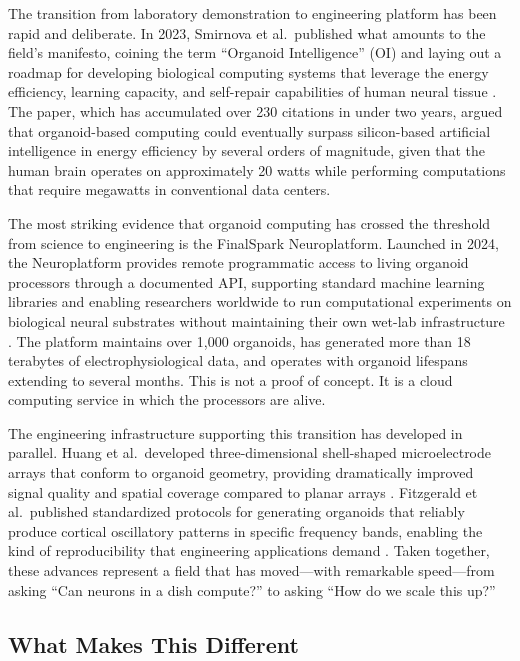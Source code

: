 The transition from laboratory demonstration to engineering platform has been rapid and deliberate. In 2023, Smirnova et al.\ published what amounts to the field's manifesto, coining the term ``Organoid Intelligence'' (OI) and laying out a roadmap for developing biological computing systems that leverage the energy efficiency, learning capacity, and self-repair capabilities of human neural tissue \cite{smirnova2023organoid}. The paper, which has accumulated over 230 citations in under two years, argued that organoid-based computing could eventually surpass silicon-based artificial intelligence in energy efficiency by several orders of magnitude, given that the human brain operates on approximately 20 watts while performing computations that require megawatts in conventional data centers.

The most striking evidence that organoid computing has crossed the threshold from science to engineering is the FinalSpark Neuroplatform. Launched in 2024, the Neuroplatform provides remote programmatic access to living organoid processors through a documented API, supporting standard machine learning libraries and enabling researchers worldwide to run computational experiments on biological neural substrates without maintaining their own wet-lab infrastructure \cite{finalspark2024neuroplatform}. The platform maintains over 1,000 organoids, has generated more than 18 terabytes of electrophysiological data, and operates with organoid lifespans extending to several months. This is not a proof of concept. It is a cloud computing service in which the processors are alive.

The engineering infrastructure supporting this transition has developed in parallel. Huang et al.\ developed three-dimensional shell-shaped microelectrode arrays that conform to organoid geometry, providing dramatically improved signal quality and spatial coverage compared to planar arrays \cite{huang2022shell}. Fitzgerald et al.\ published standardized protocols for generating organoids that reliably produce cortical oscillatory patterns in specific frequency bands, enabling the kind of reproducibility that engineering applications demand \cite{fitzgerald2024oscillation}. Taken together, these advances represent a field that has moved---with remarkable speed---from asking ``Can neurons in a dish compute?'' to asking ``How do we scale this up?''

\subsection{What Makes This Different}

